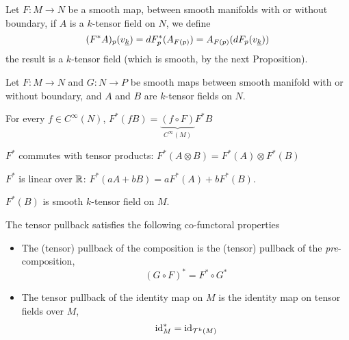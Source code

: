 \documentclass[../main-manifolds.tex]{subfiles}
\begin{document}
\begin{definition}
    Let $F: M\to N$ be a smooth map, between smooth manifolds with or without boundary, if $A$ is a $k$-tensor field on $N$, we define 
    \begin{equation}\label{tensor-field-pullback-eq}
        (F^*A)_p(\Ul{v}[k]) = dF^*_p(A_{F(p)}) = A_{F(p)}(dF_p(\Ul{v}[k]))
    \end{equation}
    the result is a $k$-tensor field (which is smooth, by the next Proposition).
\end{definition}

\begin{wts}
    Let $F: M\to N$ and $G:N\to P$ be smooth maps between smooth manifold with or without boundary, and $A$ and $B$ are $k$-tensor fields on $N$.
    \begin{enumroman}
        \item For every $f\in C^\infty(N)$, $F^*(fB) = \underbrace{(f\circ F)}_{C^\infty(M)}F^*B$
        \item $F^*$ commutes with tensor products: $F^*(A\otimes B) = F^*(A)\otimes F^*(B)$
        \item $F^*$ is linear over $\mathbb{R}$: $F^*(aA + bB) = aF^*(A) + bF^*(B)$.
        \item $F^*(B)$ is smooth $k$-tensor field on $M$.
        \item The tensor pullback satisfies the following co-functoral properties
        \begin{itemize}
            \item The (tensor) pullback of the composition is the (tensor) pullback of the \emph{pre}-composition,
            \[
                (G\circ F)^* = F^*\circ G^*
            \]
            \item The tensor pullback of the identity map on $M$ is the identity map on tensor fields over $M$,
            \[
                \operatorname{id}_{M}^* =\operatorname{id}_{\mathcal{T}^k(M)}
            \]
        \end{itemize}
    \end{enumroman}
\end{wts}
\end{document}
